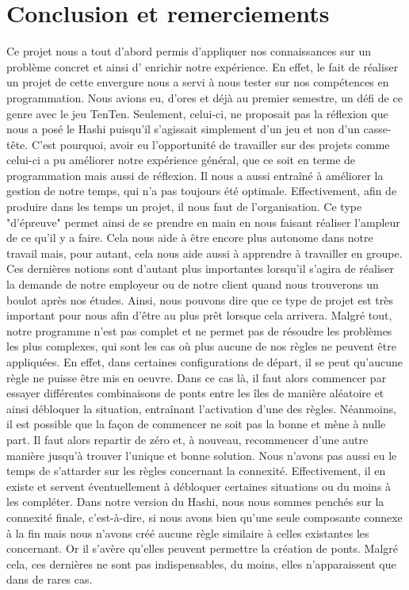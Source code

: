 \chapter*{Conclusion et remerciements}
\label{chap:conclusion}

Ce projet nous a tout d'abord permis d'appliquer nos connaissances sur un problème concret et ainsi d' enrichir notre expérience. En effet, le fait de réaliser un projet de cette envergure nous a servi à nous tester sur nos compétences en programmation. Nous avions eu, d'ores et déjà au premier semestre, un défi de ce genre avec le jeu TenTen. Seulement, celui-ci, ne proposait pas la réflexion que nous a posé le Hashi puisqu'il s'agissait simplement d'un jeu et non d'un casse-tête. C'est pourquoi, avoir eu l'opportunité de travailler sur des projets comme celui-ci a pu améliorer notre expérience général, que ce soit en terme de programmation mais aussi de réflexion.\newline
Il nous a aussi entraîné à améliorer la gestion de notre temps, qui n'a pas toujours été optimale. Effectivement, afin de produire dans les temps un projet, il nous faut de l'organisation. Ce type "d'épreuve" permet ainsi de se prendre en main en nous faisant réaliser l'ampleur de ce qu'il y a faire. Cela nous aide à être encore plus autonome dans notre travail mais, pour autant, cela nous aide aussi à apprendre à travailler en groupe. Ces dernières notions sont d'autant plus importantes lorsqu'il s'agira de réaliser la demande de notre employeur ou de notre client quand nous trouverons un boulot après nos études. Ainsi, nous pouvons dire que ce type de projet est très important pour nous afin d'être au plus prêt lorsque cela arrivera.
\smallbreak
Malgré tout, notre programme n'est pas complet et ne permet pas de résoudre les problèmes les plus complexes, qui sont les cas où plus aucune de nos règles ne peuvent être appliquées. En effet, dans certaines configurations de départ, il se peut qu'aucune règle ne puisse être mis en oeuvre. Dans ce cas là, il faut alors commencer par essayer différentes combinaisons de ponts entre les îles de manière aléatoire et ainsi débloquer la situation, entraînant l'activation d'une des règles. Néanmoins, il est possible que la façon de commencer ne soit pas la bonne et mène à nulle part. Il faut alors repartir de zéro et, à nouveau, recommencer d'une autre manière jusqu'à trouver l'unique et bonne solution.\newline
Nous n'avons pas aussi eu le temps de s'attarder sur les règles concernant la connexité. Effectivement, il en existe et servent éventuellement à débloquer certaines situations ou du moins à les compléter. Dans notre version du Hashi, nous nous sommes penchés sur la connexité finale, c'est-à-dire, si nous avons bien qu'une seule composante connexe à la fin mais nous n'avons créé aucune règle similaire à celles existantes les concernant. Or il s'avère qu'elles peuvent permettre la création de ponts. Malgré cela, ces dernières ne sont pas indispensables, du moins, elles n'apparaissent que dans de rares cas.
